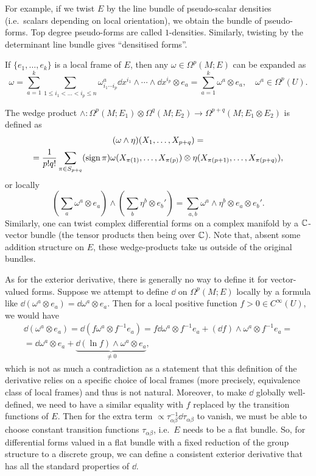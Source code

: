 For example, if we twist $E$ by the line bundle of pseudo-scalar densities (i.e.\ scalars depending on local orientation), we obtain the bundle of pseudo-forms. Top degree pseudo-forms are called $1$-densities. Similarly, twisting by the determinant line bundle gives ``densitised forms''.

If $\{e_1,\ldots,e_k\}$ is a local frame of $E$, then any $\omega\in\Omega^p(M;E)$ can be expanded as 
\[\omega=\sum_{a=1}^k\sum_{1\leq i_1<\ldots<i_p\leq n}\omega^a_{i_1\cdots i_p}\dd x^{i_1}\wedge\cdots\wedge \dd x^{i_p}\otimes e_a=\sum_{a=1}^k\omega^a\otimes e_a,\quad \omega^a\in\Omega^p(U).\]

The wedge product $\wedge:\Omega^p(M;E_1)\otimes \Omega^q(M;E_2)\to \Omega^{p+q}(M;E_1\otimes E_2)$ is defined as 
\begin{multline}
    (\omega\wedge\eta)(X_1,\ldots,X_{p+q})=\\=\frac{1}{p!q!}\sum_{\pi\in S_{p+q}}(\operatorname{sign}\pi)\omega(X_{\pi(1)},\ldots,X_{\pi(p)})\otimes\eta(X_{\pi(p+1)},\ldots,X_{\pi(p+q)}),
\end{multline}
or locally 
\[\left(\sum_a\omega^a\otimes e_a\right)\wedge \left(\sum_b\eta^b\otimes e_b'\right)=\sum_{a,b}\omega^a\wedge\eta^b\otimes e_a\otimes e_b'.\]
Similarly, one can twist complex differential forms on a complex manifold by a  $\mathbb{C}$-vector bundle (the tensor products then being over $\mathbb{C}$). Note that, absent some addition structure on $E$, these wedge-products take us outside of the original bundles.

\begin{rem}
    As for the exterior derivative, there is generally no way to define it for vector-valued forms.
    Suppose we attempt to define $\dd$ on $\Omega^p(M;E)$ locally by a formula like $\dd(\omega^a\otimes e_a)=\dd \omega^a\otimes e_a$. Then for a local positive function $f>0\in C^\infty(U)$, we would have 
    \begin{multline}
        \dd(\omega^a\otimes e_a)=\dd(f\omega^a\otimes f^{-1}e_a)=f\dd\omega^a\otimes f^{-1}e_a+(\dd f)\wedge\omega^a\otimes f^{-1}e_a=\\=\dd\omega^a\otimes e_a+\underbrace{\dd(\ln f)\wedge\omega^a\otimes e_a}_{\neq 0},
    \end{multline}
    which is not as much a contradiction as a statement that this definition of the derivative relies on a specific choice of local frames (more precisely, equivalence class of local frames) and thus is not natural. Moreover, to make $\dd$ globally well-defined, we need to have a similar equality with $f$ replaced by the transition functions of $E$. Then for the extra term $\propto \tau_{\alpha\beta}^{-1}\dd\tau_{\alpha\beta}$ to vanish, we must be able to choose constant transition functions $\tau_{\alpha\beta}$, i.e.\ $E$ needs to be a flat bundle. So, for differential forms valued in a flat bundle with a fixed reduction of the group structure to a discrete group, we can define a consistent exterior derivative that has all the standard properties of $\dd$.
\end{rem}

